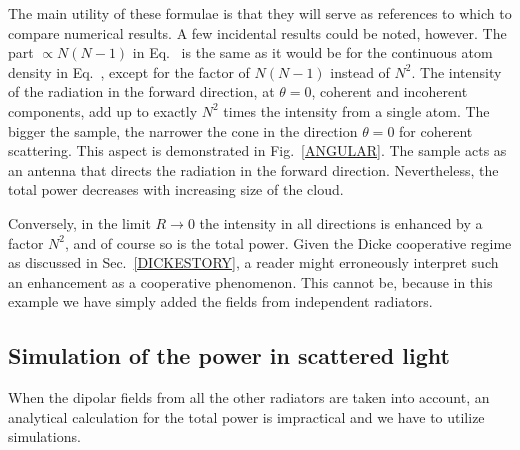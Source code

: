 The main utility of these formulae is that they will serve as references to which to compare numerical results. A few incidental results could be noted, however.  The part $\propto N(N-1)$ in Eq.~ is the same as it would be for the continuous atom density in Eq.~, except for the factor of $N(N-1)$ instead of $N^2$. The intensity of the radiation in the forward direction, at $\theta=0$, coherent and incoherent components, add up to exactly $N^2$ times the intensity from a single atom. The bigger the sample, the narrower the cone in the direction $\theta=0$ for coherent scattering.  This aspect is demonstrated in Fig.~\ref{ANGULAR}. The sample acts as an antenna that directs the radiation in the forward direction. Nevertheless, the total power decreases with increasing size of the cloud.

Conversely, in the limit $R\rightarrow0$ the intensity in all directions is enhanced by a factor $N^2$, and of course so is the total power. Given the Dicke cooperative regime as discussed in Sec.~\ref{DICKESTORY}, a reader might erroneously interpret such an enhancement as a cooperative phenomenon. This cannot be, because in this example we have simply added the fields from independent radiators.


\subsection{Simulation of the power in scattered light} 

When the dipolar fields from all the other radiators are taken into account, an analytical calculation for the total power is impractical and we have to utilize simulations. 


